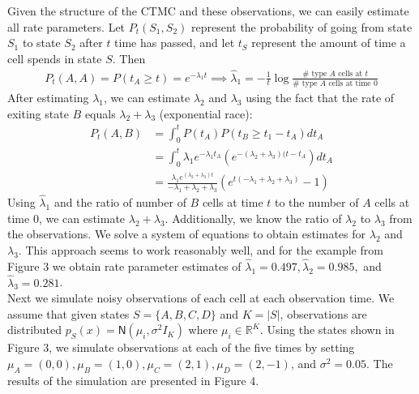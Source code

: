 \documentclass[11pt,onecolumn]{article}
\begin{document}
Given the structure of the CTMC and these observations, we can easily estimate all rate parameters. Let $P_t(S_1,S_2)$ represent the probability of going from state $S_1$ to state $S_2$ after $t$ time has passed, and let $t_S$ represent the amount of time a cell spends in state $S$. Then
\begin{align*}
	P_t(A,A) = P(t_A \geq t) = e^{-\lambda_1 t} \implies \hat{\lambda}_1 = -\frac{1}{t} \log \frac{\# \mbox{ type $A$ cells at $t$}}{\# \mbox{ type $A$ cells at time 0}}
\end{align*}
After estimating $\lambda_1$, we can estimate $\lambda_2$ and $\lambda_3$ using the fact that the rate of exiting state $B$ equals $\lambda_2+\lambda_3$ (exponential race):
\begin{align*}
	P_t(A,B) & = \int_0^t P(t_A) P(t_B \geq t_1 - t_A) dt_A \\
	& = \int_0^t \lambda_1 e^{-\lambda_1 t_A} (e^{-(\lambda_2+\lambda_3)(t-t_A})dt_A \\
	& = \frac{\lambda_1 e^{(\lambda_2+\lambda_3)t}}{-\lambda_1+\lambda_2 + \lambda_3} \left(e^{t(-\lambda_1 + \lambda_2 + \lambda_3)}-1 \right)
\end{align*}
Using $\hat{\lambda}_1$ and the ratio of number of $B$ cells at time $t$ to the number of $A$ cells at time 0, we can estimate $\lambda_2 + \lambda_3$. Additionally, we know the ratio of $\lambda_2$ to $\lambda_3$ from the observations. We solve a system of equations to obtain estimates for $\lambda_2$ and $\lambda_3$. This approach seems to work reasonably well, and for the example from Figure 3 we obtain rate parameter estimates of $\hat{\lambda}_1 = 0.497, \hat{\lambda}_2 = 0.985,$ and $\hat{\lambda}_3 = 0.281$. \\

Next we simulate noisy observations of each cell at each observation time. We assume that given states $S = \{A,B,C,D\}$ and $K = |S|$, observations are distributed $p_S(x) = \textsf{N}(\mu_i,\sigma^2 I_K)$ where $\mu_i \in \mathbb{R}^K$. Using the states shown in Figure 3, we simulate observations at each of the five times by setting $\mu_A = (0,0), \mu_B = (1,0), \mu_C = (2,1), \mu_D = (2,-1)$, and $\sigma^2 = 0.05$. The results of the simulation are presented in Figure 4. \\
\end{document}
